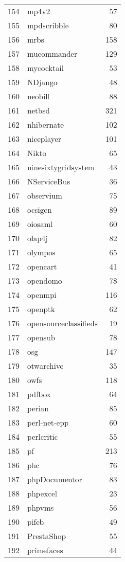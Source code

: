 \begin{table}[ht]
\begin{tabular}{rlr}
  154 & mp4v2 &  57 \\ 
  155 & mpdscribble &  80 \\ 
  156 & mrbs & 158 \\ 
  157 & mucommander & 129 \\ 
  158 & mycocktail &  53 \\ 
  159 & NDjango &  48 \\ 
  160 & neobill &  88 \\ 
  161 & netbsd & 321 \\ 
  162 & nhibernate & 102 \\ 
  163 & niceplayer & 101 \\ 
  164 & Nikto &  65 \\ 
  165 & ninesixtygridsystem &  43 \\ 
  166 & NServiceBus &  36 \\ 
  167 & observium &  75 \\ 
  168 & ocsigen &  89 \\ 
  169 & oiosaml &  60 \\ 
  170 & olap4j &  82 \\ 
  171 & olympos &  65 \\ 
  172 & opencart &  41 \\ 
  173 & opendomo &  78 \\ 
  174 & openmpi & 116 \\ 
  175 & openptk &  62 \\ 
  176 & opensourceclassifieds &  19 \\ 
  177 & opensub &  78 \\ 
  178 & osg & 147 \\ 
  179 & otwarchive &  35 \\ 
  180 & owfs & 118 \\ 
  181 & pdfbox &  64 \\ 
  182 & perian &  85 \\ 
  183 & perl-net-epp &  60 \\ 
  184 & perlcritic &  55 \\ 
  185 & pf & 213 \\ 
  186 & phc &  76 \\ 
  187 & phpDocumentor &  83 \\ 
  188 & phpexcel &  23 \\ 
  189 & phpvms &  56 \\ 
  190 & pifeb &  49 \\ 
  191 & PrestaShop &  55 \\ 
  192 & primefaces &  44 \\ 

\end{tabular}
\end{table}
